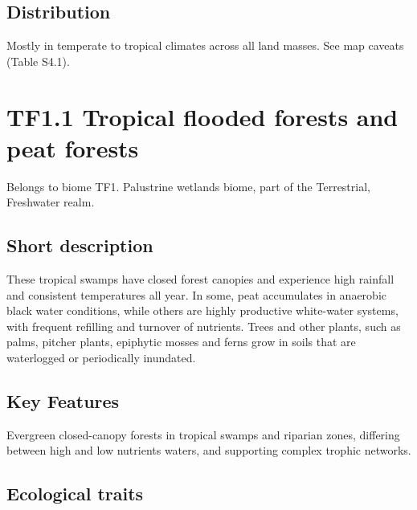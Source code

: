 \documentclass[
  letterpaper,
  DIV=11,
  numbers=noendperiod]{scrartcl}
\begin{document}
\subsection{Distribution}\label{distribution-102}

Mostly in temperate to tropical climates across all land masses. See map
caveats (Table S4.1).

\section{TF1.1 Tropical flooded forests and peat
forests}\label{tf1.1-tropical-flooded-forests-and-peat-forests}

Belongs to biome TF1. Palustrine wetlands biome, part of the
Terrestrial, Freshwater realm.

\subsection{Short description}\label{short-description-103}

These tropical swamps have closed forest canopies and experience high
rainfall and consistent temperatures all year. In some, peat accumulates
in anaerobic black water conditions, while others are highly productive
white-water systems, with frequent refilling and turnover of nutrients.
Trees and other plants, such as palms, pitcher plants, epiphytic mosses
and ferns grow in soils that are waterlogged or periodically inundated.

\subsection{Key Features}\label{key-features-103}

Evergreen closed-canopy forests in tropical swamps and riparian zones,
differing between high and low nutrients waters, and supporting complex
trophic networks.

\subsection{Ecological traits}\label{ecological-traits-103}
\end{document}
